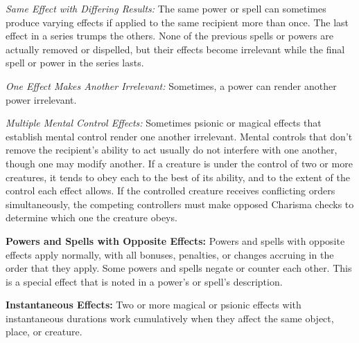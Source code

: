 \textit{Same Effect with Differing Results:} The same power or spell can sometimes produce varying effects if applied to the same recipient more than once. The last effect in a series trumps the others. None of the previous spells or powers are actually removed or dispelled, but their effects become irrelevant while the final spell or power in the series lasts.

\textit{One Effect Makes Another Irrelevant:} Sometimes, a power can render another power irrelevant.

\textit{Multiple Mental Control Effects:} Sometimes psionic or magical effects that establish mental control render one another irrelevant. Mental controls that don't remove the recipient's ability to act usually do not interfere with one another, though one may modify another. If a creature is under the control of two or more creatures, it tends to obey each to the best of its ability, and to the extent of the control each effect allows. If the controlled creature receives conflicting orders simultaneously, the competing controllers must make opposed Charisma checks to determine which one the creature obeys.

\textbf{Powers and Spells with Opposite Effects:} Powers and spells with opposite effects apply normally, with all bonuses, penalties, or changes accruing in the order that they apply. Some powers and spells negate or counter each other. This is a special effect that is noted in a power's or spell's description.

\textbf{Instantaneous Effects:} Two or more magical or psionic effects with instantaneous durations work cumulatively when they affect the same object, place, or creature.